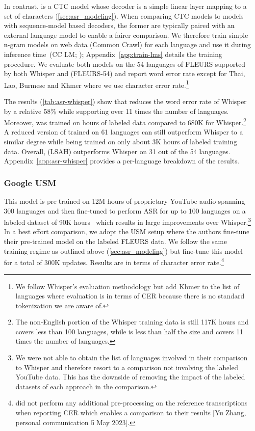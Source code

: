 In contrast, \modelname{} is a CTC model whose decoder is a simple linear layer mapping to a set of characters (\textsection\ref{sec:asr_modeling}).
When comparing CTC models to models with sequence-model based decoders, the former are typically paired with an external language model to enable a fairer comparison.
We therefore train simple n-gram models on web data (Common Crawl) for each language and use it during inference time~(CC LM; \citealt{heafield-2011-kenlm,conneau2020xlsr,nllbteam2022language}); Appendix~\ref{app:train-lms} details the training procedure.
We evaluate both models on the 54 languages of FLEURS supported by both Whisper and \modelname{}  (FLEURS-54) and report word error rate except for  Thai, Lao, Burmese and Khmer where we use character error rate.\footnote{We follow Whisper's evaluation methodology but add Khmer to the list of languages where evaluation is in terms of CER because there is no standard tokenization we are aware of.}


The results (\autoref{tab:asr-whisper}) show that \modelname{} reduces the word error rate of Whisper by a relative 58\% while supporting over 11 times the number of languages.
Moreover, \modelname{} was trained on \nummmshrs{} hours of labeled data compared to 680K for Whisper.\footnote{The non-English portion of the Whisper training data is still 117K hours and covers less than 100 languages, while \MMS{} is less than half the size and covers 11 times the number of languages.}
A reduced version of \modelname{} trained on 61 languages can still outperform Whisper to a similar degree while being trained on only about 3K hours of labeled training data.
Overall, \modelname{} (LSAH) outperforms Whisper on 31 out of the 54 languages.
Appendix~\ref{app:asr-whisper} provides a per-language breakdown of the results.



\subsubsection{Google USM}
\label{sec:asr-comp-usm}

This model is pre-trained on 12M hours of proprietary YouTube audio spanning 300 languages and then fine-tuned to perform ASR for up to 100 languages on a labeled dataset of 90K hours~\citep{zhang2023usm} which results in large improvements over Whisper.\footnote{
We were not able to obtain the list of languages involved in their comparison to Whisper and therefore resort to a comparison not involving the labeled YouTube data. 
This has the downside of removing the impact of the labeled datasets of each approach in the comparison.
}
In a best effort comparison, we adopt the USM setup where the authors fine-tune their pre-trained model on the labeled FLEURS data.
We follow the same training regime as outlined above (\textsection\ref{sec:asr_modeling}) but fine-tune this model for a total of 300K updates.
Results are in terms of character error rate.\footnote{\citet{zhang2023usm} did not perform any additional pre-processing on the reference transcriptions when reporting CER which enables a comparison to their results [Yu Zhang, personal communication 5 May 2023].}

